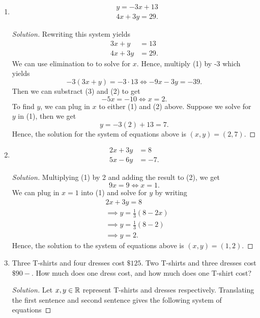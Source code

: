 \documentclass{article}
\begin{document}
\begin{enumerate}
\begin{proof}[Solution]
\begin{center}
    \end{center}
    \end{proof}
Solve the following system of equations.
\item \begin{align*}
    &y = -3x + 13  \\
    &4x + 3y = 29.
\end{align*}
\begin{proof}[Solution]
Rewriting this system yields 
\begin{align*}
    3x + y  &= 13 \tag{1}\\
    4x + 3y &= 29 \tag{2}.
\end{align*}
We can use elimination to to solve for \( x\). Hence, multiply (1) by -3 which yields 
\[ -3(3x + y ) = -3 \cdot 13 \iff -9x -3y = -39. \tag{3}\]
Then we can substract (3) and (2) to get 
\[ -5x = -10 \iff x = 2.\]
To find \(y\), we can plug in \(x\) to either (1) and (2) above. Suppose we solve for \( y \) in (1), then we get 
\[ y = -3(2) + 13 = 7.\]
Hence, the solution for the system of equations above is \( (x,y) = (2,7)\).
\end{proof}
\item \begin{align*}
        2x + 3y &= 8  \tag{1}\\
        5x - 6y &= -7. \tag{2}
\end{align*}
\begin{proof}[Solution]
Multiplying (1) by 2 and adding the result to (2), we get 
\[ 9x = 9 \iff x = 1.\]
We can plug in \( x = 1 \) into (1) and solve for \(y\) by writing
\begin{align*}
    &2x + 3y = 8 \\
    &\implies y = \frac{1}{3} (8 - 2x)\\
    &\implies y = \frac{1}{3} (8 - 2) \\
    &\implies y = 2.
\end{align*}
Hence, the solution to the system of equations above is \( (x,y) = (1,2)\). 
\end{proof}
\item Three T-shirts and four dresses cost \( \$ 125\). Two T-shirts and three dresses cost \( \$ 90-\). How much does one dress cost, and how much does one T-shirt cost? 
\begin{proof}[Solution]
    Let \( x,y \in \mathbb{R} \) represent T-shirts and dresses respectively. Translating the first sentence and second sentence gives the following system of equations


\end{proof}
\end{enumerate}
\end{document}
